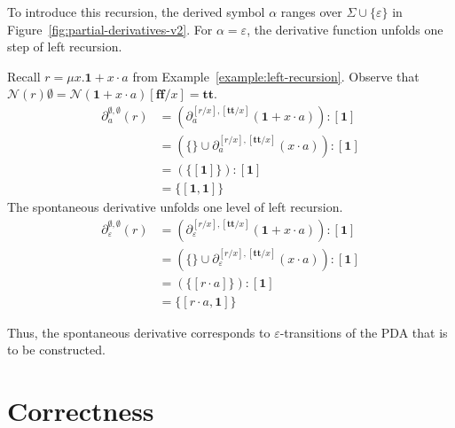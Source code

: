 \documentclass[runningheads, envcountsame, a4paper]{llncs}
\newcommand{\True}{\ensuremath{\mathbf{tt}}}%
\newcommand{\False}{\ensuremath{\mathbf{ff}}}%
\newcommand\pderiv[3][{}]{\partial^{#1}_{#3}(#2)}
\newcommand\Rnull{\mathbf0}
\newcommand\Rempty{\mathbf1}
\newcommand\PUSH{:}
\newcommand\SINGLETON[1]{{[#1]}}
\newcommand\Null{\mathcal{N}}
\begin{document}
To introduce this recursion, the derived symbol $\alpha$
ranges over $\Sigma\cup\{\varepsilon\}$ in
Figure~\ref{fig:partial-derivatives-v2}. 
For $\alpha=\varepsilon$, the derivative function unfolds one step of
left recursion. 
\begin{example}\label{example:broken-recursion}
  Recall $r = \mu x. \Rempty + x \cdot a$ from Example~\ref{example:left-recursion}. Observe that
  $\Null (r) \emptyset = \Null (\Rempty + x \cdot a) [\False/x] = \True$.
  \begin{align*}
    \pderiv[\emptyset,\emptyset]{r}{a}
    &= (\pderiv[{[r/x],[\True/x]}]{\Rempty + x \cdot a}{a}) \PUSH \SINGLETON{\Rempty} \\
    &= ( \{ \} \cup \pderiv[{[r/x],[\True/x]}]{x \cdot a}{a}) \PUSH \SINGLETON{\Rempty} \\
    &= ( \{ \SINGLETON{\Rempty}\}) \PUSH    \SINGLETON{\Rempty} \\
    &= \{ \SINGLETON{\Rempty, \Rempty}
      \} 
  \end{align*}
  The spontaneous derivative unfolds one level of left recursion.
  \begin{align*}
    \pderiv[\emptyset,\emptyset]{r}{\varepsilon}
    &= (\pderiv[{[r/x],[\True/x]}]{\Rempty + x \cdot a}{\varepsilon}) \PUSH \SINGLETON{\Rempty} \\
    &= ( \{ \} \cup \pderiv[{[r/x],[\True/x]}]{x \cdot a}{\varepsilon}) \PUSH \SINGLETON{\Rempty} \\
    &= ( \{ \SINGLETON{r \cdot a}\}) \PUSH    \SINGLETON{\Rempty} \\
    &= \{ \SINGLETON{r\cdot a, \Rempty}
    \} 
  \end{align*}
\end{example}
Thus, the spontaneous derivative corresponds to
$\varepsilon$-transitions of the PDA 
that is to be constructed. 


\section{Correctness}
\label{sec:correctness}
\end{document}
